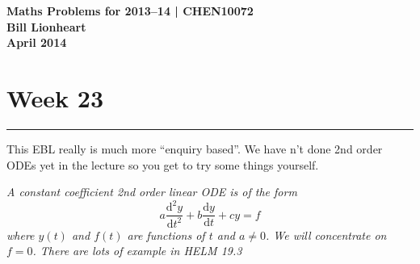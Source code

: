 \documentclass[11pt,a4paper]{article}
\newcommand{\diff}{\mathrm{d}}
\begin{document}
\begin{center} 
{\bf Maths Problems for 2013--14 | CHEN10072 \\
Bill Lionheart\\
 April 2014}
\end{center}

\section*{Week 23}
\hrule
\smallskip

This EBL really is much more ``enquiry based''. We have n't done 2nd order ODEs yet in the lecture so you get to try some things yourself.

{\em A constant coefficient 2nd order linear ODE is of the form
$$  a\frac{\diff^2 y}{\diff t^2}  + b \frac{\diff y}{\diff t} +c y = f $$
where $y(t)$ and $f(t)$ are functions of $t$ and $a\ne 0$. We will concentrate on $f=0$. There are lots of example in HELM 19.3}
\end{document}
